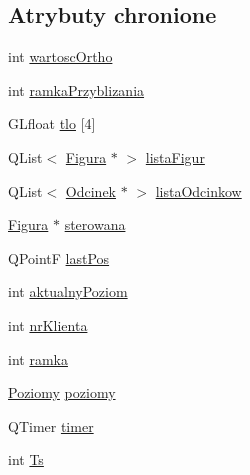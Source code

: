 \subsection*{Atrybuty chronione}
\begin{DoxyCompactItemize}
\item 
int \hyperlink{classMyGLWidget_a2a7fab72a9434ab8a32f67768f758011}{wartosc\-Ortho}
\item 
int \hyperlink{classMyGLWidget_ae1dab2275c515885d170d48a682d1943}{ramka\-Przyblizania}
\item 
G\-Lfloat \hyperlink{classMyGLWidget_a8d0f06e3361addec1ba11fe317de2c60}{tlo} \mbox{[}4\mbox{]}
\item 
Q\-List$<$ \hyperlink{classFigura}{Figura} $\ast$ $>$ \hyperlink{classMyGLWidget_abaf64d08c7bac0df986839ac063b02c2}{lista\-Figur}
\item 
Q\-List$<$ \hyperlink{classOdcinek}{Odcinek} $\ast$ $>$ \hyperlink{classMyGLWidget_a8bffb841dfb582085520d96a83ae09b9}{lista\-Odcinkow}
\item 
\hyperlink{classFigura}{Figura} $\ast$ \hyperlink{classMyGLWidget_afaf6be98dbfe311829f71f5b97ab6081}{sterowana}
\item 
Q\-Point\-F \hyperlink{classMyGLWidget_afc6be3de6cfab3079b8d36ab85d13317}{last\-Pos}
\item 
int \hyperlink{classMyGLWidget_ab3fcfaa0bcedb9ee1b56fdacf58499ba}{aktualny\-Poziom}
\item 
int \hyperlink{classMyGLWidget_aa3f67be6e4f2bf11f257d5843d17e8aa}{nr\-Klienta}
\item 
int \hyperlink{classMyGLWidget_abcd5810bea3e05c3c658491bd1d6fd43}{ramka}
\item 
\hyperlink{classPoziomy}{Poziomy} \hyperlink{classMyGLWidget_af24378be9ebc485231a336d72b9ae698}{poziomy}
\item 
Q\-Timer \hyperlink{classMyGLWidget_a5b154232ee1d21cc8b034e28798a5245}{timer}
\item 
int \hyperlink{classMyGLWidget_a0c89380896bd79421cd4c6fcae3e0e18}{Ts}
\end{DoxyCompactItemize}


